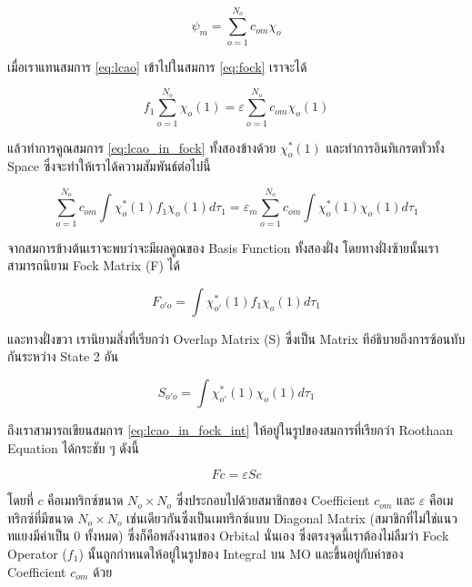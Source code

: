 \begin{equation}
    \label{eq:lcao}
    \psi_{m} = \sum^{N_{o}}_{o=1} c_{om} \chi_{o} 
\end{equation}

เมื่อเราแทนสมการ \ref{eq:lcao} เข้าไปในสมการ \ref{eq:fock} เราจะได้

\begin{equation}
    \label{eq:lcao_in_fock}
    f_{1} \sum^{N_{o}}_{o=1} \chi_{o}(1) = \varepsilon \sum^{N_{o}}_{o=1} c_{om} \chi_{o}(1)
\end{equation}

แล้วทำการคูณสมการ \ref{eq:lcao_in_fock} ทั้งสองข้างด้วย $\chi^{*}_{o}(1)$ และทำการอินทิเกรตทั่วทั้ง Space ซึ่งจะทำให้เราได้ความสัมพันธ์ต่อไปนี้

\begin{equation}
    \label{eq:lcao_in_fock_int}
    \sum^{N_{o}}_{o=1} c_{om} \int \chi^{*}_{o}(1) f_{1} \chi_{o}(1) d\tau_{1} =
    \varepsilon_{m} \sum^{N_{o}}_{o=1} c_{om} \int \chi^{*}_{o}(1) \chi_{o}(1) d\tau_{1}
\end{equation}

จากสมการข้างต้นเราจะพบว่าจะมีผลคูณของ Basis Function ทั้งสองฝั่ง โดยทางฝั่งซ้ายนั้นเราสามารถนิยาม Fock Matrix (F) ได้

\begin{equation}
    \label{eq:matrix_fock}
    F_{o'o} = \int \chi^{*}_{o'}(1) f_{1} \chi_{o}(1) d\tau_{1}
\end{equation}

และทางฝั่งขวา เรานิยามสิ่งที่เรียกว่า Overlap Matrix (S) ซึ่งเป็น Matrix ทีอ่ธิบายถึงการซ้อนทับกันระหว่าง State 2 อัน

\begin{equation}
    \label{eq:matrix_overlap}
    S_{o'o} = \int \chi^{*}_{o'}(1) \chi_{o}(1) d\tau_{1}
\end{equation}

ถึงเราสามารถเขียนสมการ \ref{eq:lcao_in_fock_int} ให้อยู่ในรูปของสมการที่เรียกว่า Roothaan Equation ได้กระชับ ๆ ดังนี้

\begin{equation}
    \label{eq:roothaan}
    F c = \varepsilon S c
\end{equation}

โดยที่ $c$ คือเมทริกซ์ขนาด $N_{o} \times N_{o}$ ซึ่งประกอบไปด้วยสมาชิกของ Coefficient $c_{om}$ และ $\varepsilon$ คือเมทริกซ์ที่มีขนาด
$N_{o} \times N_{o}$ เช่นเดียวกันซึ่งเป็นเมทริกซ์แบบ Diagonal Matrix (สมาชิกที่ไม่ใช่แนวทแยงมีค่าเป็น 0 ทั้งหมด) ซึ่งก็คือพลังงานของ Orbital นั่นเอง
ซึ่งตรงจุดนี้เราต้องไม่ลืมว่า Fock Operator ($f_{1}$) นั้นถูกกำหนดให้อยู่ในรูปของ Integral บน MO และขึ้นอยู่กับค่าของ Coefficient $c_{om}$ ด้วย

